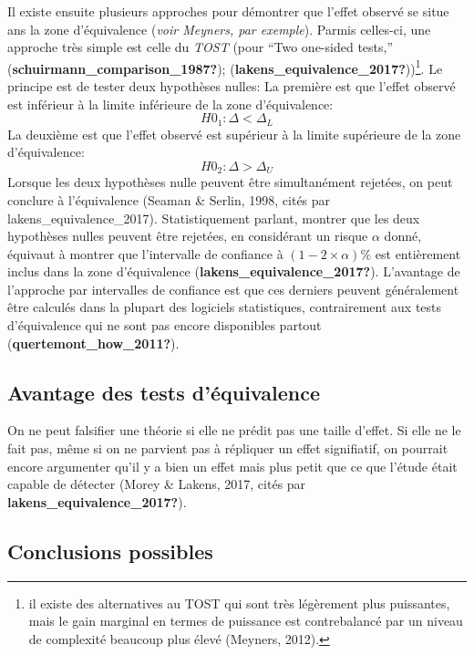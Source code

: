 \documentclass[
  english,
  man]{apa6}
\begin{document}
Il existe ensuite plusieurs approches pour démontrer que l'effet observé se situe ans la zone d'équivalence (\emph{voir Meyners, par exemple}). Parmis celles-ci, une approche très simple est celle du \emph{TOST} (pour ``Two one-sided tests,'' (\textbf{schuirmann\_comparison\_1987?}); (\textbf{lakens\_equivalence\_2017?}))\footnote{il existe des alternatives au TOST qui sont très légèrement plus puissantes, mais le gain marginal en termes de puissance est contrebalancé par un niveau de complexité beaucoup plus élevé (Meyners, 2012).}. Le principe est de tester deux hypothèses nulles: La première est que l'effet observé est inférieur à la limite inférieure de la zone d'équivalence: \[H0_1: \Delta < \Delta_L\] La deuxième est que l'effet observé est supérieur à la limite supérieure de la zone d'équivalence: \[H0_2: \Delta > \Delta_U\] Lorsque les deux hypothèses nulle peuvent être simultanément rejetées, on peut conclure à l'équivalence (Seaman \& Serlin, 1998, cités par lakens\_equivalence\_2017). Statistiquement parlant, montrer que les deux hypothèses nulles peuvent être rejetées, en considérant un risque \(\alpha\) donné, équivaut à montrer que l'intervalle de confiance à \((1-2\times\alpha)\%\) est entièrement inclus dans la zone d'équivalence (\textbf{lakens\_equivalence\_2017?}). L'avantage de l'approche par intervalles de confiance est que ces derniers peuvent généralement être calculés dans la plupart des logiciels statistiques, contrairement aux tests d'équivalence qui ne sont pas encore disponibles partout (\textbf{quertemont\_how\_2011?}).

\hypertarget{avantage-des-tests-duxe9quivalence}{%
\subsection{Avantage des tests d'équivalence}\label{avantage-des-tests-duxe9quivalence}}

On ne peut falsifier une théorie si elle ne prédit pas une taille d'effet. Si elle ne le fait pas, même si on ne parvient pas à répliquer un effet signifiatif, on pourrait encore argumenter qu'il y a bien un effet mais plus petit que ce que l'étude était capable de détecter (Morey \& Lakens, 2017, cités par \textbf{lakens\_equivalence\_2017?}).

\hypertarget{conclusions-possibles}{%
\subsection{Conclusions possibles}\label{conclusions-possibles}}
\end{document}
